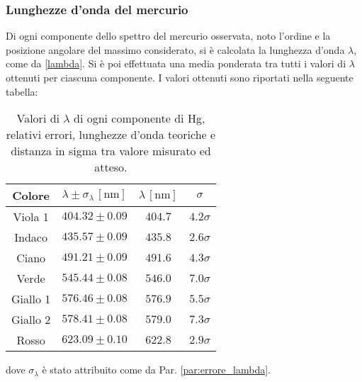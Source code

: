 \documentclass[]{article}
\begin{document}
    \subsubsection{Lunghezze d'onda del mercurio}
    Di ogni componente dello spettro del mercurio osservata, noto l'ordine e la posizione angolare del massimo considerato, si è calcolata la lunghezza d'onda $\lambda$, come da \ref{lambda}. Si è poi effettuata una media ponderata tra tutti i valori di $\lambda$ ottenuti per ciascuna componente. I valori ottenuti sono riportati nella seguente tabella:
    \begin{table}[H]
        \centering
        \begin{tabular}{||c|c|c|c||}
            \hline
            Colore & $\lambda \pm \sigma_{\lambda} \, \left[\text{nm}\right]$ & $\lambda \, \left[\text{nm}\right]$ & $\sigma$\\
            \hline \hline
            Viola 1  & $404.32 \pm 0.09$ & $404.7$ & $4.2\sigma$ \\\hline
            Indaco   & $435.57 \pm 0.09$ & $435.8$ & $2.6\sigma$ \\\hline
            Ciano    & $491.21 \pm 0.09$ & $491.6$ & $4.3\sigma$ \\\hline
            Verde    & $545.44 \pm 0.08$ & $546.0$ & $7.0\sigma$ \\\hline
            Giallo 1 & $576.46 \pm 0.08$ & $576.9$ & $5.5\sigma$ \\\hline
            Giallo 2 & $578.41 \pm 0.08$ & $579.0$ & $7.3\sigma$ \\\hline
            Rosso    & $623.09 \pm 0.10$ & $622.8$ & $2.9\sigma$ \\\hline
        \end{tabular}
        \caption{Valori di $\lambda$ di ogni componente di Hg, relativi errori, lunghezze d'onda teoriche e distanza in sigma tra valore misurato ed atteso.}
        \label{lambda-Hg-values}
    \end{table}
    dove $\sigma_{\lambda}$ è stato attribuito come da Par. \ref{par:errore_lambda}.
\end{document}

